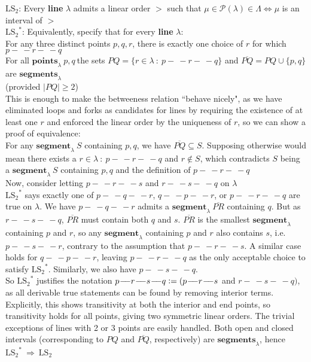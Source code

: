 \documentclass{article}
\newcommand{\hcm}[1][1]{\hspace{#1 cm}}
\newcommand{\nl}[1][12]{\\[#1pt]}
\newcommand{\imp}{\ \Rightarrow\ }
\newcommand{\st}{\ : \ }
\newcommand{\defeq}{\vcentcolon=}
\newcommand{\ch}[1]{\text{#1}}
\newcommand {\chb}[1]{\textbf{#1}}
\newcommand{\seg}{\!-\!\!\!\!\:-}
\begin{document}
\begin{flushleft}
$\ch{LS}_2$: Every \chb{line} $\lambda$ admits a linear order $>$ such that $\mu \in \mathcal{P}(\lambda) \in \Lambda \iff \mu$ is an interval of $>$\nl[5]

{\color{purple}
	${\ch{LS}_2}^*$: Equivalently, specify that for every \chb{line} $\lambda$:\\
	
	\hcm[2]For any three distinct points $p,q,r$, there is exactly one choice of $r$ for which $p\seg r \seg q$\\
	
	\hcm[2]For all $\chb{points}_\lambda\ p,q\ $the sets $PQ = \{r \in \lambda \st p\seg r \seg q\}$ and $\overline{PQ} = PQ\cup \{p,q\}$ are $\chb{segments}_\lambda$\\\hcm[2](provided $|PQ|\geq2$)\nl[5]
	
	\hcm This is enough to make the betweeness relation ``behave nicely", as we have eliminated loops and forks as candidates for lines by requiring the existence of at least one $r$ and enforced the linear order by the uniqueness of $r$, so we can show a proof of equivalence:\nl[5]
	
	\hcm For any $\chb{segment}_\lambda\ S$ containing $p, q$, we have $\overline{PQ} \subseteq S$. Supposing otherwise would mean there exists a $r \in \lambda \st p\seg r \seg q$ and $r \notin S$, which contradicts $S$ being a $\chb{segment}_\lambda\ S$ containing $p, q$ and the definition of $p\seg r \seg q$\nl[5]
	 
	\hcm Now, consider letting $p \seg r \seg s$ and $r\seg s\seg q$ on $\lambda$\nl[5]
	\hcm${\ch{LS}_2}^*$ says exactly one of $p\seg q \seg r$, $q \seg p \seg r$, or $p \seg r \seg q$ are true on $\lambda$. We have $p \seg q \seg r$ admits a $\chb{segment}_\lambda\ \overline{PR}$ containing $q$. But as $r\seg s \seg q$, $\overline{PR}$ must contain both $q$ and $s$. $\overline{PR}$ is the smallest $\chb{segment}_\lambda$ containing $p$ and $r$, so any $\chb{segment}_\lambda$ containing $p$ and $r$ also contains $s$, i.e. $p\seg s \seg r$, contrary to the assumption that $p \seg r \seg s$. A similar case holds for $q \seg p \seg r$, leaving $p \seg r \seg q$ as the only acceptable choice to satisfy ${\ch{LS}_2}^*$. Similarly, we also have $p \seg s \seg q$.\nl[5]
	
	\hcm So ${\ch{LS}_2}^*$ justifies the notation $p \seg r \seg s \seg q \defeq (p \seg r \seg s$ and $r \seg s \seg q)$, as all derivable true statements can be found by removing interior terms. Explicitly, this shows transitivity at both the interior and end points, so transitivity holds for all points, giving two symmetric linear orders. The trivial exceptions of lines with 2 or 3 points are easily handled. Both open and closed intervals (corresponding to $PQ$ and $\overline{PQ}$, respectively) are $\chb{segments}_\lambda$, hence ${\ch{LS}_2}^* \imp \ch{LS}_2$\nl[5]
}
	

\end{flushleft}
\end{document}
